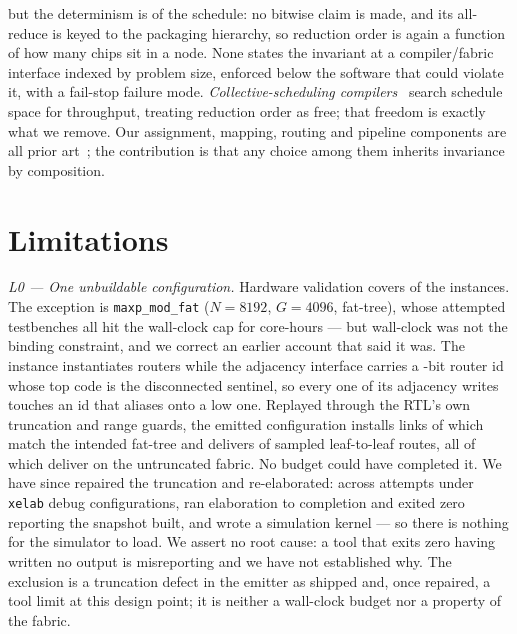 \documentclass[journal,10pt]{IEEEtran}
\theoremstyle{plain}
\theoremstyle{definition}
\theoremstyle{remark}
\newcommand{\sv}[1]{\texttt{#1}}
\begin{document}
but the determinism is of the schedule: no bitwise claim is made, and its
all-reduce is keyed to the packaging hierarchy, so reduction order is again a
function of how many chips sit in a node. None states the invariant at a
compiler/fabric interface indexed by problem size, enforced below the software
that could violate it, with a fail-stop failure mode.
\emph{Collective-scheduling
compilers}~\cite{cai2021synthesizing,shah2023taccl,thakur2005optimization,%
rabenseifner2004optimization} search schedule space for throughput, treating
reduction order as free; that freedom is exactly what we remove. Our
assignment, mapping, routing and pipeline components are all prior
art~\cite{topcuoglu2002heft,lukes1974efficient,dally2004principles}; the
contribution is that any choice among them inherits invariance by composition.


\section{Limitations}\label{sec:limitations}

\emph{L0 --- One unbuildable configuration.} Hardware validation covers
\TournNInst{} of the \SuiteSize{} instances. The exception is
\sv{maxp\_mod\_fat} ($N{=}8192$, $G{=}4096$, fat-tree), whose
\MaxpAttempts{} attempted testbenches all hit the wall-clock cap for
\MaxpCoreHours{} core-hours --- but wall-clock was not the binding constraint,
and we correct an earlier account that said it was. The instance instantiates
\MaxpRouters{} routers while the adjacency interface carries a
\RouterIdBits-bit router id whose top code is the disconnected sentinel, so
every one of its \MaxpAdjEntries{} adjacency writes touches an id that aliases
onto a low one. Replayed through the RTL's own truncation and range guards,
the emitted configuration installs \MaxpLinksInstalled{} links of which
\MaxpLinksCorrect{} match the intended fat-tree and delivers
\MaxpRoutesDelivered{} of \MaxpRoutesSampled{} sampled leaf-to-leaf routes,
all \MaxpRoutesSampled{} of which deliver on the untruncated fabric. No budget
could have completed it. We have since repaired the truncation and
re-elaborated: across \MaxpElabAttempts{} attempts under \MaxpDebugCfgs{}
\sv{xelab} debug configurations, \MaxpElabClean{} ran elaboration to
completion and exited zero reporting the snapshot built, and \MaxpKernels{}
wrote a simulation kernel --- so there is nothing for the simulator to load.
We assert no root cause: a tool that exits zero having written no output is
misreporting and we have not established why. The exclusion is a truncation
defect in the emitter as shipped and, once repaired, a tool limit at this
design point; it is neither a wall-clock budget nor a property of the fabric.
\end{document}
